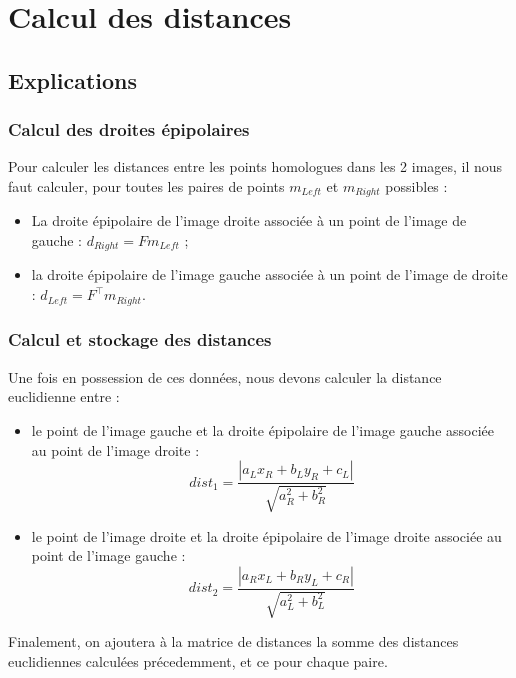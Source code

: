 \documentclass[a4paper]{article}
\begin{document}
\section{Calcul des distances}

\subsection{Explications}

\subsubsection{Calcul des droites épipolaires}
Pour calculer les distances entre les points homologues dans les 2 images, il nous faut calculer, pour toutes les paires de points $m_{Left}$ et $m_{Right}$ possibles :
\begin{itemize}
  \item La droite épipolaire de l'image droite associée à un point de l'image de gauche : $d_{Right} = Fm_{Left}$ ;
  \item la droite épipolaire de l'image gauche associée à un point de l'image de droite : $d_{Left} = F^\top m_{Right}$.
\end{itemize}

\subsubsection{Calcul et stockage des distances}

Une fois en possession de ces données, nous devons calculer la distance euclidienne entre :
\begin{itemize}
  \item le point de l'image gauche et la droite épipolaire de l'image gauche associée au point de l'image droite :
  \begin{equation}
    dist_1 = \frac{|a_Lx_R + b_Ly_R + c_L|}{\sqrt{a_R^2 + b_R^2}}
  \end{equation}
  \item le point de l'image droite et la droite épipolaire de l'image droite associée au point de l'image gauche :
  \begin{equation}
    dist_2 = \frac{|a_Rx_L + b_Ry_L + c_R|}{\sqrt{a_L^2 + b_L^2}}
  \end{equation}
\end{itemize}

Finalement, on ajoutera à la matrice de distances la somme des distances euclidiennes calculées précedemment, et ce pour chaque paire.
\end{document}
